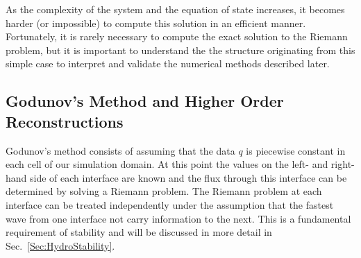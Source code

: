 As the complexity of the system and the equation of state increases, it becomes harder (or impossible) to compute this solution in an efficient manner.
Fortunately, it is rarely necessary to compute the exact solution to the Riemann problem, but it is important to understand the the structure originating from this simple case to interpret and validate the numerical methods described later.


\subsection{Godunov's Method and Higher Order Reconstructions}

Godunov's method \citep{Godunov1959} consists of assuming that the data $q$ is piecewise constant in each cell of our simulation domain.
At this point the values on the left- and right-hand side of each interface are known and the flux through this interface can be determined by solving a Riemann problem.
The Riemann problem at each interface can be treated independently under the assumption that the fastest wave from one interface not carry information to the next.
This is a fundamental requirement of stability and will be discussed in more detail in Sec.~\ref{Sec:HydroStability}.

